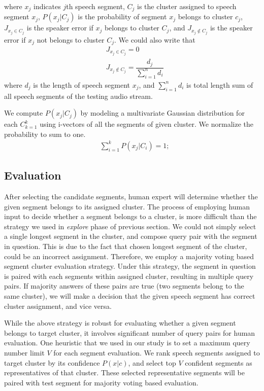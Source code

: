 \documentclass[journal]{IEEEtran}
\begin{document}
where $x_j$ indicates $j$th speech segment, $C_j$ is the cluster assigned to speech segment $x_j$, $P(x_j|C_j)$ is the probability of segment $x_j$ belongs to cluster $c_j$, $J_{x_j \in C_j} $ is the speaker error if $x_j$ belongs to cluster $C_j$, and $J_{x_j \notin C_j}$ is the speaker error if $x_j$ not belongs to cluster $C_j$. We could also write that
\begin{equation}
\begin{aligned}
&J_{x_j \in C_j} = 0 \\
&J_{x_j \notin C_j} = \dfrac{d_j}{\sum_{i=1}^{n} d_i}
\label{jj}
\end{aligned}
\end{equation} 
where $d_j$ is the length of speech segment $x_j$, and $\sum_{i=1}^{n} d_i$ is total length sum of all speech segments of the testing audio stream.

We compute $P(x_j|C_j)$ by modeling a multivariate Gaussian distribution for each $C_{k=1}^{k}$ using i-vectors of all the segments of given cluster. We normalize the probability to sum to one.
\begin{equation}
\begin{aligned}
&  \sum_{i=1}^{k} P(x_j|C_i) = 1;
\label{jj}
\end{aligned}
\end{equation}
 
\subsection{Evaluation}
After selecting the candidate segments, human expert will determine whether the given segment belongs to its assigned cluster. The process of employing human input to decide whether a segment belongs to a cluster, is more difficult than the strategy we used in \textit{explore} phase of previous section. We could not simply select a single longest segment in the cluster, and compose query pair with the segment in question. This is due to the fact that chosen longest segment of the cluster, could be an incorrect assignment. Therefore, we employ a majority voting based segment cluster evaluation strategy. Under this strategy, the segment in question is paired with each segments within assigned cluster, resulting in multiple query pairs. If majority answers of these pairs are true (two segments belong to the same cluster), we will make a decision that the given speech segment has correct cluster assignment, and vice versa. 

While the above strategy is robust for evaluating whether a given segment belongs to target cluster, it involves significant number of query pairs for human evaluation. One heuristic that we used in our study is to set a maximum query number limit $V$ for each segment evaluation. We rank speech segments assigned to target cluster by its confidence $P(x|c)$, and select top $V$ confident segments as representatives of that cluster. These selected representative segments will be paired with test segment for majority voting based evaluation. 
\end{document}
